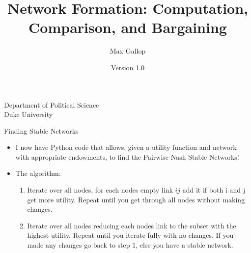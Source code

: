 \documentclass{beamer}
\begin{document}
\lstset{
basicstyle=\ttfamily,
keywordstyle=\bfseries,
showstringspaces=false,
columns = fullflexible,
mathescape = false,
language=R
}


\title[Gallop Network Formation]
{Network Formation: Computation, Comparison, and Bargaining}
\author[M. Gallop]
{Max Gallop} 
\institute
{		Department of Political Science\\
		Duke University\\
		
		}

\date{Version 1.0}

\begin{frame}
\titlepage
\end{frame}


\begin{frame}{Finding Stable Networks}
\begin{itemize}
\item I now have Python code that allows, given a utility function and network with appropriate endowments, to find the Pairwise Nash Stable Networks!
\item The algorithm:
\begin{enumerate}
\item Iterate over all nodes, for each nodes empty link $ij$ add it if both i and j get more utility. Repeat until you get through all nodes without making changes.
\item Iterate over all nodes reducing each nodes link to the subset with the highest utility. Repeat until you iterate fully with no changes. If you made any changes go back to step 1, else you have a stable network.
\end{enumerate}
\end{itemize}
\end{frame}
\end{document}
